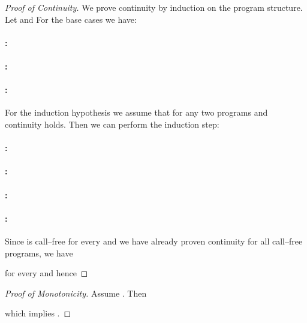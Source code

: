 \begin{proof}[Proof of Continuity]
We prove continuity by induction on the program structure.
Let  and 
For the base cases we have:
\paragraph{:}

\paragraph{:}

\paragraph{:}

For the induction hypothesis we assume that for any two programs  and  continuity holds.
Then we can perform the induction step:
\paragraph{:}

\paragraph{:}

\paragraph{:}

\paragraph{:}

Since  is call--free for every  and we have already proven continuity for all call--free programs, we have

for every  and hence

\end{proof}



\begin{proof}[Proof of Monotonicity]
Assume . Then

which implies .
\end{proof}



